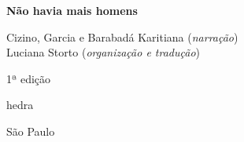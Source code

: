 




\begingroup\thispagestyle{empty}\vspace*{.05\textheight} 

              {\formular
              \huge
              \noindent
              \textbf{Não havia mais homens}\\
              
              \vspace{-0.5cm}
              
              }


              

              \vfill              

              {\small
              \noindent{}Cizino, Garcia e Barabadá Karitiana (\textit{narração})\vspace{0.2cm}\\
              \noindent{}Luciana Storto (\textit{organização e tradução})
              }

              \vspace{0.5cm}

              {\small\noindent{}1ª edição}

              \vfill
              \newfontfamily{}
              {\noindent\fontsize{30}{40}\selectfont \timesnewroman hedra}

              {\selectfont\small\noindent São Paulo \quad\the\year}

\endgroup
\pagebreak
